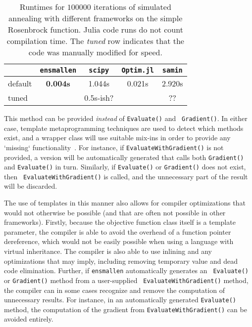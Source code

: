 \documentclass{article}
\begin{document}
\begin{table}[t]
\begin{center}
\begin{tabular}{lcccc}
\toprule
 & {\tt ensmallen} & {\tt scipy} & {\tt Optim.jl} & {\tt samin} \\
\midrule
default & {\bf 0.004s} & 1.044s & 0.021s & 2.920s \\
tuned & & 0.5s-ish? & & ?? \\ %
\bottomrule
\end{tabular}
\end{center}
\caption{Runtimes for $100000$ iterations of simulated annealing with different
frameworks on the simple Rosenbrock function.  Julia code runs do not count
compilation time.  The {\it tuned} row indicates that the code was manually
modified for speed.}
\label{tab:rosenbrock_results}
\end{table}

This method can be provided {\it instead} of {\tt Evaluate()} and {\tt
Gradient()}.  In either case, template metaprogramming techniques are used to
detect which methods exist, and a wrapper class will use suitable mix-ins in
order to provide any `missing` functionality~\cite{smaragdakis2000mixin}.  For
instance, if {\tt EvaluateWithGradient()} is not provided, a version will be
automatically generated that calls both {\tt Gradient()} and {\tt Evaluate()} in turn.
Similarly, if {\tt Evaluate()} or {\tt Gradient()} does not exist, then {\tt
EvaluateWithGradient()} is called, and the unnecessary part of the result will
be discarded.

The use of templates in this manner also allows for compiler optimizations that
would not otherwise be possible (and that are often not possible in other
frameworks).  Firstly, because the objective function class itself is a template
parameter, the compiler is able to avoid the overhead of a function pointer
dereference, which would not be easily possible when using a language with
virtual inheritance.  The compiler is also able to use inlining and any
optimizations that may imply, including removing temporary value and dead code
elimination.  Further, if {\tt ensmallen} automatically generates an {\tt
Evaluate()} or {\tt Gradient()} method from a user-supplied {\tt
EvaluateWithGradient()} method, the compiler can in some cases recognize and
remove the computation of unnecessary results.  For instance, in an
automatically generated {\tt Evaluate()} method, the computation of the gradient
from {\tt EvaluateWithGradient()} can be avoided entirely.
\end{document}
